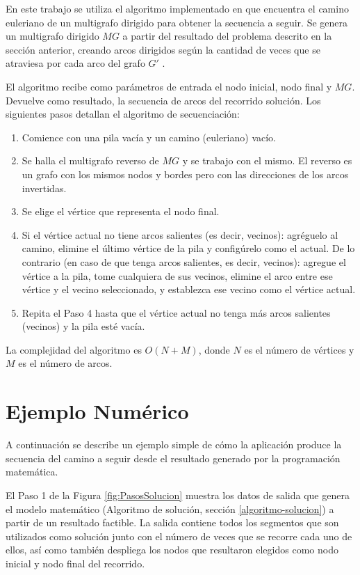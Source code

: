 En este trabajo se utiliza el algoritmo implementado en \cite{RiveraHazim2015APath} que encuentra el camino euleriano de un multigrafo dirigido para obtener la secuencia a seguir. Se genera un multigrafo dirigido $MG$ a partir del resultado del problema descrito en la sección anterior, creando arcos dirigidos según la cantidad de veces que se atraviesa por cada arco del grafo $G'$ . 

El algoritmo recibe como parámetros de entrada el nodo inicial, nodo final y $MG$. Devuelve como resultado, la secuencia de arcos del recorrido solución. Los siguientes pasos detallan el algoritmo de secuenciación:

\begin{enumerate}
    \item Comience con una pila vacía y un camino (euleriano) vacío. 
    \item Se halla el multigrafo reverso de $MG$ y se trabajo con el mismo. El reverso es un grafo con los mismos nodos y bordes pero con las direcciones de los arcos invertidas.
    \item Se elige el vértice que representa el nodo final.
    \item Si el vértice actual no tiene arcos salientes (es decir, vecinos): agréguelo al camino, elimine el último vértice de la pila y configúrelo como el actual. De lo contrario (en caso de que tenga arcos salientes, es decir, vecinos): agregue el vértice a la pila, tome cualquiera de sus vecinos, elimine el arco entre ese vértice y el vecino seleccionado, y establezca ese vecino como el vértice actual.
    \item Repita el Paso 4 hasta que el vértice actual no tenga más arcos salientes (vecinos) y la pila esté vacía.
\end{enumerate}

La complejidad del algoritmo es $O(N + M)$, donde $N$ es el número de vértices y $M$ es el número de arcos.

\section{Ejemplo Numérico}
A continuación se describe un ejemplo simple de cómo la aplicación produce la secuencia del camino a seguir desde el resultado generado por la programación matemática.

El Paso 1 de la Figura \ref{fig:PasosSolucion} muestra los datos de salida que genera el modelo matemático (Algoritmo  de  solución, sección \ref{algoritmo-solucion}) a partir de un resultado factible. La salida contiene todos los segmentos que son utilizados como solución junto con el número de veces que se recorre cada uno de ellos, así como también despliega los nodos que resultaron elegidos como nodo inicial y nodo final del recorrido. 

